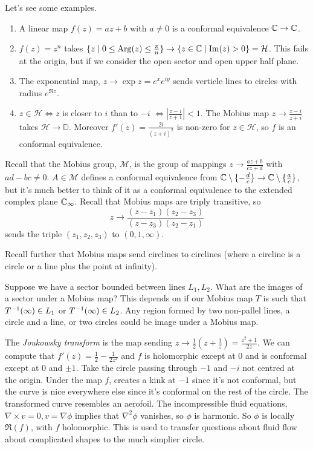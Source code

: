 \documentclass{article}
\newcommand{\Arg}{\mathrm{Arg}}
\begin{document}
Let's see some examples.
\begin{enumerate}
	\item A linear map $ f(z) = az+b $ with $ a\ne 0 $ is a conformal equivalence $ \mathbb{C}\to \mathbb{C} $.
	\item $ f(z)=z^n  $ takes $ \{ z\mid 0\le \Arg(z) \le \frac \pi n\} \to \{ z\in \C \mid \Im(z) > 0 \} = \mathcal H$. This fails at the origin, but if we consider the open sector and open upper half plane.
	\item The exponential map, $ z\to \exp z =e^x e^{iy} $ sends verticle lines to circles with radius $ e^{\Re z} $. 
	\item $ z\in \mathcal H\iff z $ is closer to $ i $ than to $ -i$ $ \iff \left|\frac{z-i}{z+1} \right| < 1 $. The Mobius map $ z\to \frac{z-i}{z+i} $ takes $ \mathcal H \to \mathbb D$. Moreover $ f'(z) = \frac{2i}{(z+i)^2} $ is non-zero for $ z\in \mathcal H $, so $ f $ is an conformal equivalence.
\end{enumerate}
Recall that the Mobius group, $ \mathcal M $, is the group of mappings $ z\to \frac{az+b}{cz+d} $ with $ ad-bc\ne 0 $. $ A\in \mathcal M $ defines a conformal equivalence from $ \mathbb{C}\setminus \{-\frac dc\}\to \mathbb{C}\setminus \{\frac ac\} $, but it's much better to think of it as a conformal equivalence to the extended complex plane $ \mathbb{C}_\infty $. Recall that Mobius maps are triply transitive, so
\[
	z\to \frac{(z-z_1)(z_2-z_3)}{(z-z_3)(z_2-z_1)}
\]
sends the triple $ (z_1,z_2,z_3) $ to $ (0,1,\infty) $.
\par
Recall further that Mobius maps send circlines to circlines (where a circline is a circle or a line plus the point at infinity).
\par
Suppose we have a sector bounded between lines $ L_1, L_2 $. What are the images of a sector under a Mobius map? This depends on if our Mobius map $ T $ is such that $ {T}^{-1}(\infty) \in L_1 $ or $ {T}^{-1}(\infty) \in L_2 $. Any region formed by two non-pallel lines, a circle and a line, or two circles could be image under a Mobius map.
\par
The \textit{Joukowsky transform} is the map sending $ z\to \frac 12\left(z+\frac 1z\right) =\frac{z^2+ 1}{2z}$. We can compute that $ f'(z) = \frac 12-\frac 1{2z^2} $ and $ f $ is holomorphic except at $ 0 $ and is conformal except at $ 0 $ and $ \pm 1 $. Take the circle passing through $ -1 $ and $ -i $ not centred at the origin. Under the map $ f $, creates a kink at $ -1 $ since it's not conformal, but the curve is nice everywhere else since it's conformal on the rest of the circle. The transformed curve resembles an aerofoil. The incompressible fluid equations, $ \nabla\times v = 0, v=\nabla \phi $ implies that $ \nabla^2 \phi $ vanishes, so $ \phi $ is harmonic. So $ \phi $ is locally $ \Re(f) $, with $ f $ holomorphic. This is used to transfer questions about fluid flow about complicated shapes to the much simplier circle.
\end{document}
